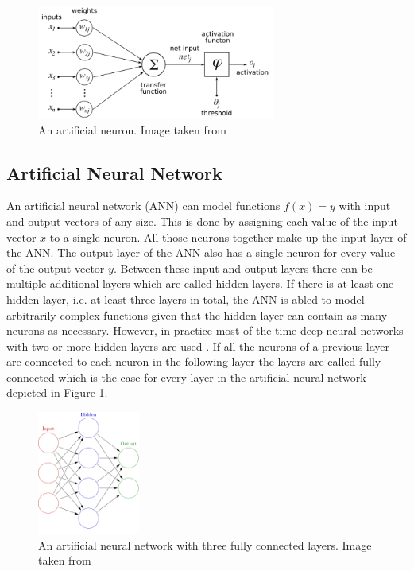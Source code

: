 \begin{figure}[H]
    \centering
    \includegraphics[width=0.7\textwidth]{images/figures/artificial_neuronHOML.png}
    \caption{An artificial neuron. Image taken from \parencite{2005-chrislb-artificial-neuron}}
\end{figure}


\subsection{Artificial Neural Network}

An artificial neural network (ANN) can model functions $f(x) = y$ with input and output vectors of any size.
This is done by assigning each value of the input vector $x$ to a single neuron. All those neurons together make
up the input layer of the ANN. The output layer of the ANN also has a single neuron for every value of the
output vector $y$. Between these input and output layers there can be multiple additional layers which are called
hidden layers. If there is at least one hidden layer, i.e. at least three layers in total, the ANN is abled to 
model arbitrarily complex functions given that the hidden layer can contain as many neurons as necessary.
However, in practice most of the time
deep neural networks with two or more hidden layers are used \parencite{2017-geron-homl}.
If all the neurons of a previous layer are connected to each neuron in the following layer the layers are
called fully connected which is the case for every layer in the artificial neural network depicted
in Figure \ref{figure_fully_connected_nn}.

\begin{figure}[ht] 
    \centering
    \includegraphics[width=0.3\textwidth]{images/figures/artificial_neural_network.png}
    \caption{An artificial neural network with three fully connected layers.
    Image taken from \parencite{2013-glosser-ann}} \label{figure_fully_connected_nn}
\end{figure} 

